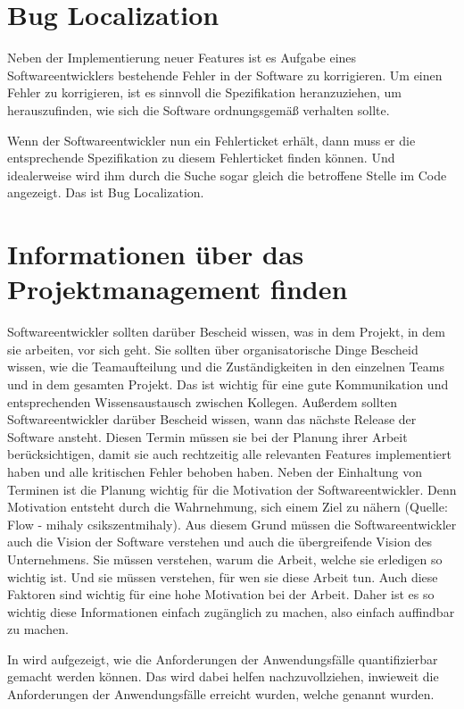 \section{Bug Localization}
Neben der Implementierung neuer Features ist es Aufgabe eines Softwareentwicklers bestehende Fehler in der Software zu korrigieren.
Um einen Fehler zu korrigieren, ist es sinnvoll die Spezifikation heranzuziehen, um herauszufinden, wie sich die Software ordnungsgemäß verhalten sollte.

Wenn der Softwareentwickler nun ein Fehlerticket erhält, dann muss er die entsprechende Spezifikation zu diesem Fehlerticket finden können.
Und idealerweise wird ihm durch die Suche sogar gleich die betroffene Stelle im Code angezeigt.
Das ist Bug Localization.

\section{Informationen über das Projektmanagement finden}
Softwareentwickler sollten darüber Bescheid wissen, was in dem Projekt, in dem sie arbeiten, vor sich geht.
Sie sollten über organisatorische Dinge Bescheid wissen, wie die Teamaufteilung und die Zuständigkeiten in den einzelnen Teams und in dem gesamten Projekt.
Das ist wichtig für eine gute Kommunikation und entsprechenden Wissensaustausch zwischen Kollegen.
Außerdem sollten Softwareentwickler darüber Bescheid wissen, wann das nächste Release der Software ansteht.
Diesen Termin müssen sie bei der Planung ihrer Arbeit berücksichtigen, damit sie auch rechtzeitig alle relevanten Features implementiert haben und alle kritischen Fehler behoben haben.
Neben der Einhaltung von Terminen ist die Planung wichtig für die Motivation der Softwareentwickler.
Denn Motivation entsteht durch die Wahrnehmung, sich einem Ziel zu nähern (Quelle: Flow - mihaly csikszentmihaly).
Aus diesem Grund müssen die Softwareentwickler auch die Vision der Software verstehen und auch die übergreifende Vision des Unternehmens.
Sie müssen verstehen, warum die Arbeit, welche sie erledigen so wichtig ist.
Und sie müssen verstehen, für wen sie diese Arbeit tun.
Auch diese Faktoren sind wichtig für eine hohe Motivation bei der Arbeit.
Daher ist es so wichtig diese Informationen einfach zugänglich zu machen, also einfach auffindbar zu machen.

In  wird aufgezeigt, wie die Anforderungen der Anwendungsfälle quantifizierbar gemacht werden können.
Das wird dabei helfen nachzuvollziehen, inwieweit die Anforderungen der Anwendungsfälle erreicht wurden, welche genannt wurden.
